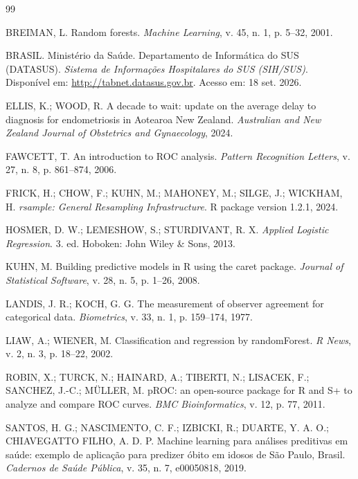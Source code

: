 \documentclass[12pt,a4paper]{article}
\begin{document}
\begin{thebibliography}{99}

 BREIMAN, L. Random forests. \textit{Machine Learning}, v. 45, n. 1, p. 5--32, 2001.

 BRASIL. Ministério da Saúde. Departamento de Informática do SUS (DATASUS). \textit{Sistema de Informações Hospitalares do SUS (SIH/SUS)}. Disponível em: \url{http://tabnet.datasus.gov.br}. Acesso em: 18 set. 2026.

 ELLIS, K.; WOOD, R. A decade to wait: update on the average delay to diagnosis for endometriosis in Aotearoa New Zealand. \textit{Australian and New Zealand Journal of Obstetrics and Gynaecology}, 2024.

 FAWCETT, T. An introduction to ROC analysis. \textit{Pattern Recognition Letters}, v. 27, n. 8, p. 861--874, 2006.

 FRICK, H.; CHOW, F.; KUHN, M.; MAHONEY, M.; SILGE, J.; WICKHAM, H. \textit{rsample: General Resampling Infrastructure}. R package version 1.2.1, 2024.

 HOSMER, D. W.; LEMESHOW, S.; STURDIVANT, R. X. \textit{Applied Logistic Regression}. 3. ed. Hoboken: John Wiley \& Sons, 2013.

 KUHN, M. Building predictive models in R using the caret package. \textit{Journal of Statistical Software}, v. 28, n. 5, p. 1--26, 2008.

 LANDIS, J. R.; KOCH, G. G. The measurement of observer agreement for categorical data. \textit{Biometrics}, v. 33, n. 1, p. 159--174, 1977.

 LIAW, A.; WIENER, M. Classification and regression by randomForest. \textit{R News}, v. 2, n. 3, p. 18--22, 2002.

 ROBIN, X.; TURCK, N.; HAINARD, A.; TIBERTI, N.; LISACEK, F.; SANCHEZ, J.-C.; MÜLLER, M. pROC: an open-source package for R and S+ to analyze and compare ROC curves. \textit{BMC Bioinformatics}, v. 12, p. 77, 2011.

 SANTOS, H. G.; NASCIMENTO, C. F.; IZBICKI, R.; DUARTE, Y. A. O.; CHIAVEGATTO FILHO, A. D. P. Machine learning para análises preditivas em saúde: exemplo de aplicação para predizer óbito em idosos de São Paulo, Brasil. \textit{Cadernos de Saúde Pública}, v. 35, n. 7, e00050818, 2019.


\end{thebibliography}
\end{document}
